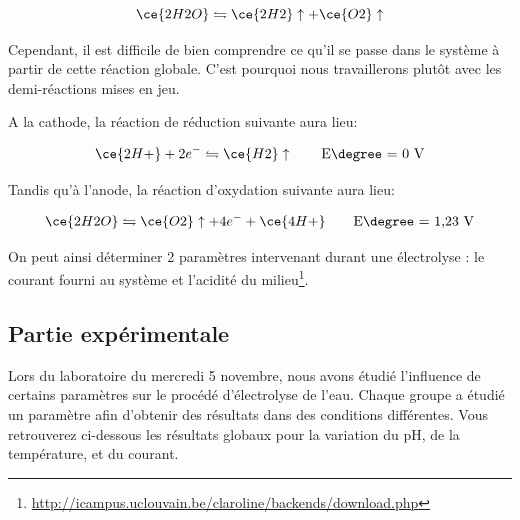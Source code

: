 $$\ce{2H2O} \leftrightharpoons \ce{2H2}\uparrow + \ce{O2}\uparrow$$

Cependant, il est difficile de bien comprendre ce qu'il se passe dans le système à partir de cette réaction globale. C’est pourquoi nous travaillerons plutôt avec les demi-réactions mises en jeu.

A la cathode, la réaction de réduction suivante aura lieu:

$$\ce{2H+} + 2 e^{-} \leftrightharpoons \ce{H2}\uparrow  \qquad \text{E\degree = 0 V}$$

Tandis qu’à l’anode, la réaction d’oxydation suivante aura lieu:

$$\ce{2H2O} \leftrightharpoons \ce{O2}\uparrow + 4 e^{-} + \ce{4H+} \qquad \text{E\degree = 1,23 V}$$

On peut ainsi déterminer 2 paramètres intervenant durant une électrolyse : le courant fourni au système et 
l’acidité du milieu\footnote{\url{http://icampus.uclouvain.be/claroline/backends/download.php}}.


\subsection{Partie expérimentale}

Lors du laboratoire du mercredi 5 novembre, nous avons étudié l'influence de certains paramètres sur le procédé d'électrolyse de l'eau. Chaque groupe a étudié un paramètre afin d'obtenir des résultats dans des conditions différentes. Vous retrouverez ci-dessous les résultats globaux pour la variation du pH, de la température, et du courant.


